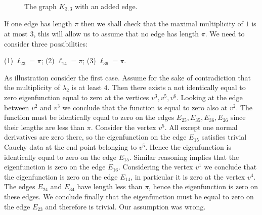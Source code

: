 \documentclass{amsart}
\theoremstyle{definition}
\theoremstyle{remark}
\numberwithin{equation}{section}
\begin{document}
\begin{figure}[ht]
\centering
{}
\caption{The graph $K_{3,3}$ with an added edge.}
\label{Fig2.3}
\end{figure}
\vspace{-2mm}


 If one edge has length $\pi$ then we shall check that the maximal multiplicity of $1$ is at most $3$, this will allow us to assume that no edge has length $\pi$. 
 We need to consider three possibilities:

\centerline{ (1) $ \ell_{23} = \pi$; \quad (2) $ \ell_{14} = \pi$; \quad (3) $ \ell_{36} = \pi$.}

 As illustration consider the first case. Assume for the sake of contradiction that the multiplicity of
$ \lambda_2 $ is at least $ 4$. Then there exists a not identically equal to zero eigenfunction equal to zero
at the vertices $ v^3,v^5,v^6$. Looking at the edge between $ v^2$ and $ v^3 $ we conclude that the function is equal
to zero also  at $ v^2$. The function must be identically equal to zero on the edges $ E_{25}, E_{35}, E_{36}, E_{26} $ since their
lengths are less than  $ \pi$. Consider the vertex $ v^5 $. All except one normal derivatives
are zero there, so the eigenfunction on the edge $E_{15}$ satisfies trivial Cauchy data
at the end point belonging to $ v^5$. Hence the eigenfunction is identically equal to zero on the edge $E_{15}$.
Similar reasoning implies that the eigenfunction is zero on the edge $ E_{16}$. Considering the vertex $ v^1 $ we conclude
that the eigenfunction is zero on the edge $E_{14}$, in particular it is zero at the vertex $ v^4$.
The edges $E_{24}$ and $ E_{34} $ have length less than $ \pi $, hence the eigenfunction is zero on these edges.
We conclude finally that the eigenfunction must be equal to zero on the edge $E_{23}$
and therefore is trivial. Our assumption was wrong.
 
\end{document}
